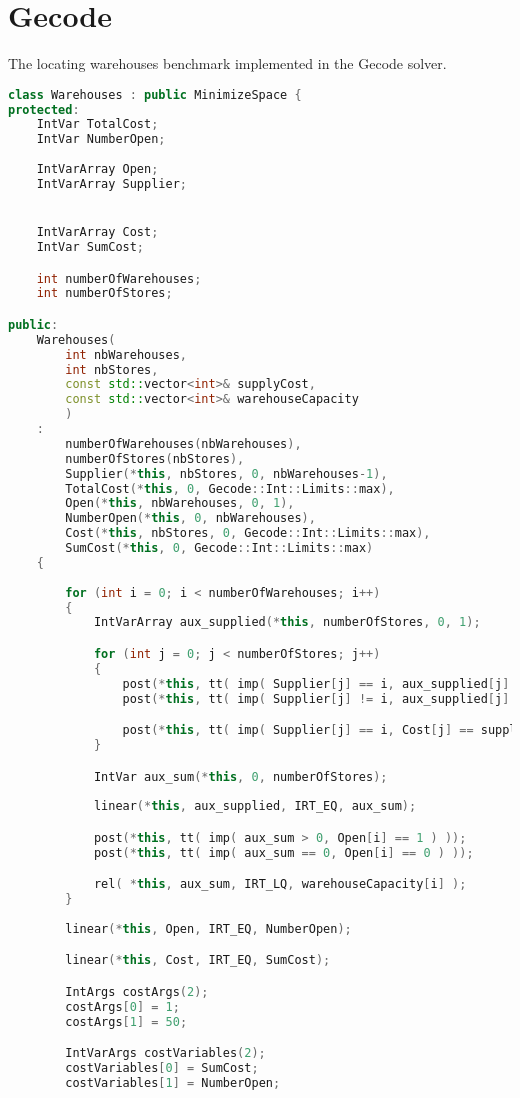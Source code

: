 \section{Gecode}

The locating warehouses benchmark implemented in the Gecode solver.

\begin{lstlisting}[language=C++]
class Warehouses : public MinimizeSpace {
protected: 
	IntVar TotalCost;
	IntVar NumberOpen;
	
	IntVarArray Open;
	IntVarArray Supplier;


	IntVarArray Cost;
	IntVar SumCost;

	int numberOfWarehouses;
	int numberOfStores;

public:
	Warehouses(
		int nbWarehouses,
		int nbStores,
		const std::vector<int>& supplyCost, 
		const std::vector<int>& warehouseCapacity
		) 
	: 
		numberOfWarehouses(nbWarehouses),
		numberOfStores(nbStores),
		Supplier(*this, nbStores, 0, nbWarehouses-1),
		TotalCost(*this, 0, Gecode::Int::Limits::max),
		Open(*this, nbWarehouses, 0, 1),
		NumberOpen(*this, 0, nbWarehouses),
		Cost(*this, nbStores, 0, Gecode::Int::Limits::max),
		SumCost(*this, 0, Gecode::Int::Limits::max)
	{
		
		for (int i = 0; i < numberOfWarehouses; i++)
		{
			IntVarArray aux_supplied(*this, numberOfStores, 0, 1);

			for (int j = 0; j < numberOfStores; j++)
			{
				post(*this, tt( imp( Supplier[j] == i, aux_supplied[j] == 1) ));
				post(*this, tt( imp( Supplier[j] != i, aux_supplied[j] == 0) ));

				post(*this, tt( imp( Supplier[j] == i, Cost[j] == supplyCost[i + j * numberOfWarehouses]) ));
			}

			IntVar aux_sum(*this, 0, numberOfStores);
			
			linear(*this, aux_supplied, IRT_EQ, aux_sum);

			post(*this, tt( imp( aux_sum > 0, Open[i] == 1 ) ));
			post(*this, tt( imp( aux_sum == 0, Open[i] == 0 ) ));

			rel( *this, aux_sum, IRT_LQ, warehouseCapacity[i] );
		}
		
		linear(*this, Open, IRT_EQ, NumberOpen);

		linear(*this, Cost, IRT_EQ, SumCost);

		IntArgs costArgs(2);
		costArgs[0] = 1;
		costArgs[1] = 50;

		IntVarArgs costVariables(2);
		costVariables[0] = SumCost;
		costVariables[1] = NumberOpen;


\end{lstlisting}
